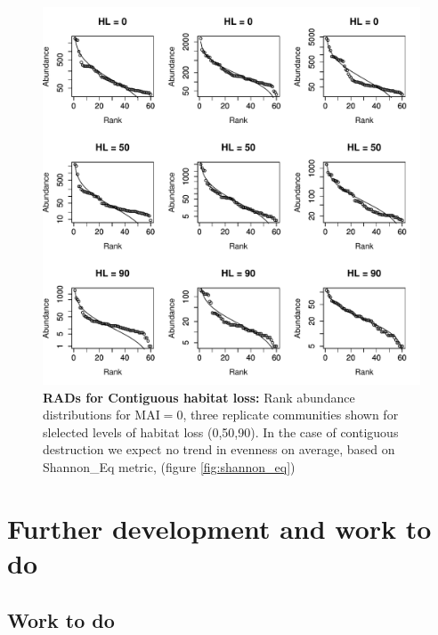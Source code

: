 \begin{figure}[p] 
		\centering      
        \includegraphics[width=\textwidth]{"contiguous_plots/RADS_mut0"}
        \caption{\textbf{RADs for Contiguous habitat loss:} Rank abundance distributions for MAI$=0$, three replicate communities shown for slelected levels of habitat loss (0,50,90). In the case of contiguous destruction we expect no trend in evenness on average, based on Shannon\_Eq metric, (figure \ref{fig:shannon_eq})}\label{fig:RADS_contiguous}
\end{figure}


\section{Further development and work to do}

\subsection{Work to do}

